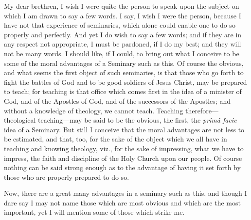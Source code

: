 My dear brethren, I wish I were quite the person to speak upon the
subject on which I am drawn to say a few words. I say, I wish I
were the person, because I have not that experience of seminaries,
which alone could enable one to do so properly and perfectly. And yet
I do wish to say a few words; and if they are in any respect not
appropriate, I must be pardoned, if I do my best; and they will not be
many words. I should like, if I could, to bring out what I conceive to
be some of the moral advantages of a Seminary such as this. Of course
the obvious, and what seems the first object of such seminaries, is
that those who go forth to fight the battles of God and to be good
soldiers of Jesus Christ, may be prepared to teach; for teaching is
that office which comes first in the idea of a minister of God, and of
the Apostles of God, and of the successors of the Apostles; and
without a knowledge of theology, we cannot teach. Teaching therefore—theological
teaching—may be said to be the obvious, the first, the \emph{primâ
facie} idea of a Seminary. But still I conceive that the moral
advantages are not less to be estimated, and that, too, for the sake
of the object which we all have in teaching and knowing theology,
viz., for the sake of impressing, what we have to impress, the faith
and discipline of the Holy Church upon our people. Of course nothing
can be said strong enough as to the advantage of having it set forth
by those who are properly prepared to do so.

Now, there are a great many advantages in a seminary such as this,
and though I dare say I may not name those which are most obvious and
which are the most important, yet I will mention some of those which
strike me.

